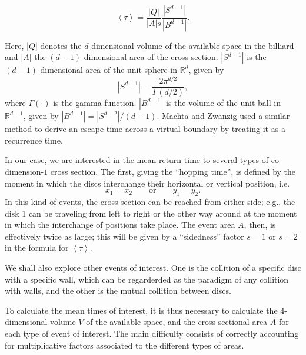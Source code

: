 \documentclass[superscriptaddress,pre,reprint,showpacs,onecolumn]{revtex4-1}
\newcommand{\mean}[1]{\left \langle #1 \right \rangle}
\newcommand{\RR}{\mathbb{R}}
\begin{document}
\begin{equation}\label{meanfreetime}
 \mean{\tau} = \frac{|Q|}{|A|s} \frac{|S^{d-1}|} {|B^{d-1}|}.
\end{equation}


Here, $|Q|$ denotes the $d$-dimensional volume of the available 
space in the billiard and 
$|A|$ the $(d-1)$-dimensional area of the cross-section.
 $|S^{d-1}|$ is the $(d-1)$-dimensional area of the unit sphere in $\RR^d$, given by
\begin{equation}
  |S^{d-1}| = \frac{2 \pi^{d/2}}{\Gamma(d/2)},
\end{equation}
where $\Gamma(\cdot)$ is the gamma function. 
$|B^{d-1}|$ is the volume of the unit ball 
in $\RR^{d-1}$, given by $|B^{d-1}| = |S^{d-2}| / (d-1)$.
Machta and Zwanzig \cite{MachtaZwan} used a similar method to derive an escape 
time across a virtual boundary by treating it as a recurrence time.

In our case, we are interested in the mean return time to 
several types of co-dimension-$1$ cross section.
The first, giving the ``hopping time'', 
is defined by the moment
in which the discs interchange their horizontal or vertical position, i.e.
\begin{equation} \label{condchoque}
x_1 = x_2  \qquad \text{or} \qquad y_1 = y_2.
\end{equation}
In this kind of events, the cross-section can be reached from either side;
e.g., the disk 1 can be traveling from left to right or the other way around
at the moment in which the interchange of positions take place. 
The event area $A$, then, 
 is effectively twice as large; this will be given by a ``sidedness'' factor $s = 1$ or $s=2$ in the formula
for $\mean{\tau}$.

We shall also explore other events of interest. One is the collition of a specific
disc with a specific wall, which can be regarderded as the paradigm of any
collition with walls, and the other is the mutual collition between discs.

To calculate the mean times of interest, it is thus necessary to calculate
the 4-dimensional volume $V$ of the available space, and the cross-sectional area $A$ 
for each type of event of interest. The main difficulty consists of correctly accounting for multiplicative factors associated to the different 
types of areas.
\end{document}
